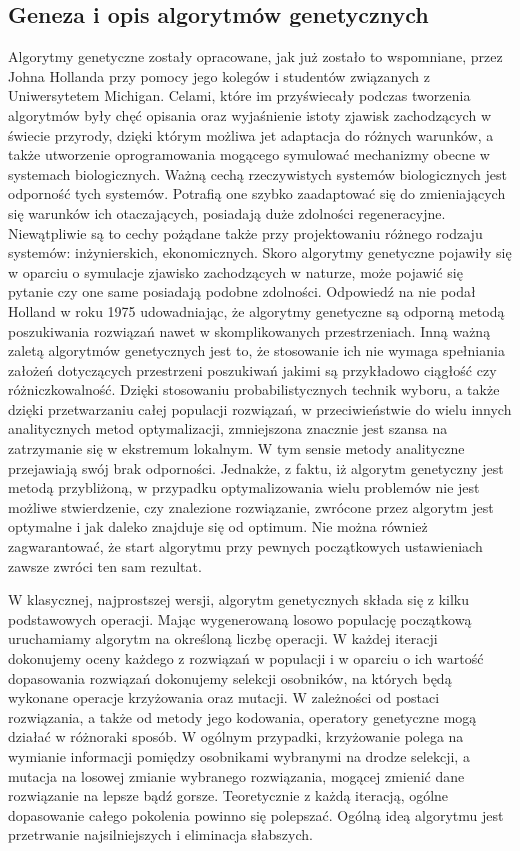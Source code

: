 \subsection{Geneza i opis algorytmów genetycznych}
Algorytmy genetyczne zostały opracowane, jak już zostało to wspomniane, przez Johna Hollanda przy pomocy jego kolegów i studentów związanych z Uniwersytetem Michigan. Celami, które im przyświecały podczas tworzenia algorytmów były chęć opisania oraz wyjaśnienie istoty zjawisk zachodzących w świecie przyrody, dzięki którym możliwa jet adaptacja do różnych warunków, a także utworzenie oprogramowania mogącego symulować mechanizmy obecne w systemach biologicznych. Ważną cechą rzeczywistych systemów biologicznych jest odporność tych systemów. Potrafią one szybko zaadaptować się do zmieniających się warunków ich otaczających, posiadają duże zdolności regeneracyjne. Niewątpliwie są to cechy pożądane także przy projektowaniu różnego rodzaju systemów: inżynierskich, ekonomicznych. Skoro algorytmy genetyczne pojawiły się w oparciu o symulacje zjawisko zachodzących w naturze, może pojawić się pytanie czy one same posiadają podobne zdolności. Odpowiedź na nie podał Holland w roku 1975 udowadniając, że algorytmy genetyczne są odporną metodą poszukiwania rozwiązań nawet w skomplikowanych przestrzeniach. Inną ważną zaletą algorytmów genetycznych jest to, że stosowanie ich nie wymaga spełniania założeń dotyczących przestrzeni poszukiwań jakimi są przykładowo ciągłość czy różniczkowalność. Dzięki stosowaniu probabilistycznych technik wyboru, a także dzięki przetwarzaniu całej populacji rozwiązań, w przeciwieństwie do wielu innych analitycznych metod optymalizacji, zmniejszona znacznie jest szansa na zatrzymanie się w ekstremum lokalnym. W tym sensie metody analityczne przejawiają swój brak odporności.
Jednakże, z faktu, iż algorytm genetyczny jest metodą przybliżoną, w przypadku optymalizowania wielu problemów nie jest możliwe stwierdzenie, czy znalezione rozwiązanie, zwrócone przez algorytm jest optymalne i jak daleko znajduje się od optimum. Nie można również zagwarantować, że start algorytmu przy pewnych początkowych ustawieniach zawsze zwróci ten sam rezultat.

W klasycznej, najprostszej wersji, algorytm genetycznych składa się z kilku podstawowych operacji. Mając wygenerowaną losowo populację początkową uruchamiamy algorytm na określoną liczbę operacji. W każdej iteracji dokonujemy oceny każdego z rozwiązań w populacji i w oparciu o ich wartość dopasowania rozwiązań dokonujemy selekcji osobników, na których będą wykonane operacje krzyżowania oraz mutacji. W zależności od postaci rozwiązania, a także od metody jego kodowania, operatory genetyczne mogą działać w różnoraki sposób. W ogólnym przypadki, krzyżowanie polega na wymianie informacji pomiędzy osobnikami wybranymi na drodze selekcji, a mutacja na losowej zmianie wybranego rozwiązania, mogącej zmienić dane rozwiązanie na lepsze bądź gorsze. Teoretycznie z każdą iteracją, ogólne dopasowanie całego pokolenia powinno się polepszać. Ogólną ideą algorytmu jest przetrwanie najsilniejszych i eliminacja słabszych.

